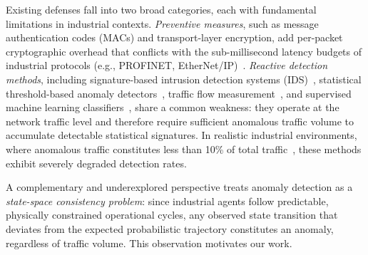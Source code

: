 \documentclass[manuscript,screen,review]{acmart}
\begin{document}
Existing defenses fall into two broad categories, each with
fundamental limitations in industrial contexts. \textit{Preventive
measures}, such as message authentication codes (MACs) and
transport-layer encryption, add per-packet cryptographic overhead
that conflicts with the sub-millisecond latency budgets of
industrial protocols (e.g., PROFINET, EtherNet/IP)~\cite{ref14,ref15}.
\textit{Reactive detection methods}, including signature-based
intrusion detection systems (IDS)~\cite{ref3,ref4}, statistical
threshold-based anomaly detectors~\cite{ref8}, traffic flow
measurement~\cite{ref6,ref23}, and supervised machine learning
classifiers~\cite{ref9,ref10,ref11}, share a common weakness:
they operate at the network traffic level and therefore require
sufficient anomalous traffic volume to accumulate detectable
statistical signatures. In realistic industrial environments,
where anomalous traffic constitutes less than 10\% of total
traffic~\cite{ref26}, these methods exhibit severely degraded
detection rates.

A complementary and underexplored perspective treats anomaly
detection as a \textit{state-space consistency problem}: since
industrial agents follow predictable, physically constrained
operational cycles, any observed state transition that deviates
from the expected probabilistic trajectory constitutes an anomaly,
regardless of traffic volume. This observation motivates our
work.
\end{document}
